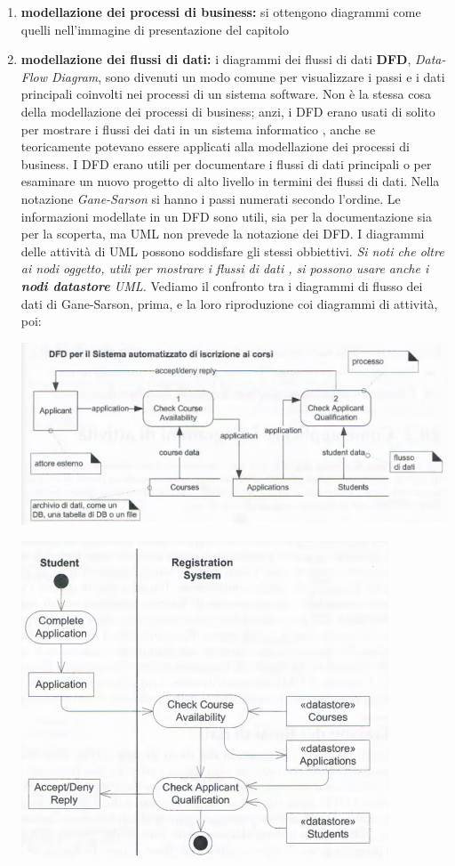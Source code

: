 \documentclass[a4paper,12pt, oneside]{book}
\begin{document}
\begin{enumerate}
	\item \textbf{modellazione dei processi di business:} 
	si ottengono diagrammi come quelli nell'immagine di presentazione del capitolo
	\item \textbf{modellazione dei flussi di dati:} i diagrammi dei flussi di dati \textbf{DFD}, \textit{Data-Flow Diagram}, sono divenuti un modo comune per visualizzare i passi e i dati principali coinvolti nei processi di un sistema software. Non è la stessa cosa della modellazione dei processi di business; anzi, i DFD erano usati di solito per mostrare i flussi dei dati in un sistema informatico , anche se teoricamente potevano essere applicati alla modellazione dei processi di business. I DFD erano utili per documentare i flussi di dati principali o per esaminare un nuovo progetto di alto livello in termini dei flussi di dati. Nella notazione \textit{Gane-Sarson} si hanno i passi numerati secondo l'ordine. Le informazioni modellate in un DFD sono utili, sia per la documentazione sia per la scoperta, ma UML non prevede la notazione dei DFD. I diagrammi delle attività di UML possono soddisfare gli stessi obbiettivi. \textit{Si noti che oltre ai nodi oggetto, utili per mostrare i flussi di dati , si possono usare anche i \textbf{nodi datastore} UML.} 
	\newpage 
	Vediamo il confronto tra i diagrammi di flusso dei dati di Gane-Sarson, prima, e la loro riproduzione coi diagrammi di attività, poi:
	\begin{center}
		\includegraphics[scale=0.6]{img/atd2.png}
	\end{center}
	\begin{center}
		\includegraphics[scale=0.6]{img/atd3.png}
	\end{center}
\end{enumerate}
\end{document}
